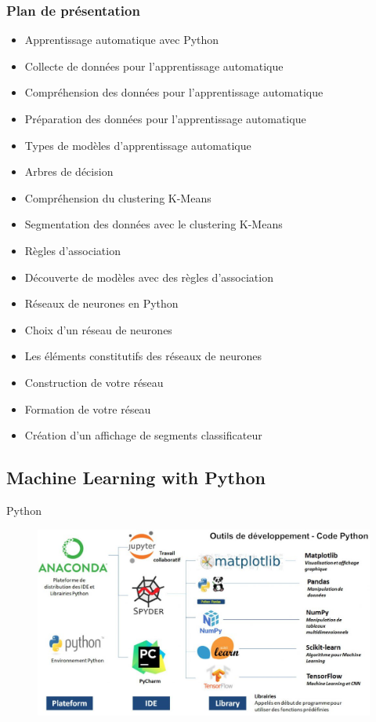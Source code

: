 \documentclass{beamer}
\begin{document}
\begin{frame}
	\frametitle{Plan de présentation}
	\begin{itemize}
		\item Apprentissage automatique avec Python
		\item Collecte de données pour l'apprentissage automatique
		\item Compréhension des données pour l'apprentissage automatique
		\item Préparation des données pour l'apprentissage automatique
		\item Types de modèles d'apprentissage automatique
		\item Arbres de décision
		\item Compréhension du clustering K-Means
		\item Segmentation des données avec le clustering K-Means
		\item Règles d'association
		\item Découverte de modèles avec des règles d'association
		\item Réseaux de neurones en Python
		\item Choix d'un réseau de neurones
		\item Les éléments constitutifs des réseaux de neurones
		\item Construction de votre réseau
		\item Formation de votre réseau
		\item Création d'un affichage de segments classificateur
	\end{itemize}
\end{frame}


\subsection{Machine Learning with Python}
\begin{frame}{Python}
	\begin{figure}
		\includegraphics[width=\textwidth]{PythonIDE.jpg}
	\end{figure}
\end{frame}
\end{document}

